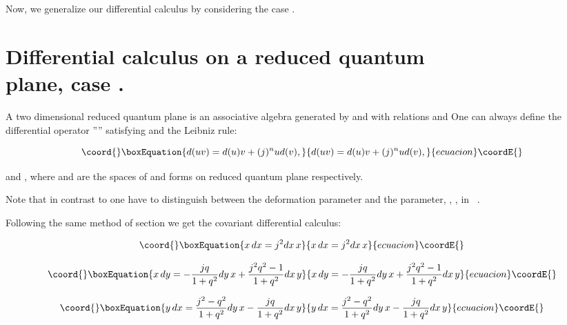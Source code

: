 \documentclass[a4paper,12pt,thmsa]{article}
\begin{document}
Now, we generalize our differential calculus by considering the case \coordHE{}.

\section{Differential calculus on a reduced quantum\protect\\plane, case \coordHE{}.}

A two dimensional reduced quantum plane is an associative algebra generated
by \coordHE{} and \coordHE{} with relations \coordHE{} and \coordHE{} One can always define the
differential operator ''\coordHE{}'' satisfying \coordHE{}  \coordHE{} and the
Leibniz rule:

\begin{equation}\coord{}\boxEquation{
d(uv)=d(u)v+(j)^nud(v),
}{
d(uv)=d(u)v+(j)^nud(v),
}{ecuacion}\coordE{}\end{equation}

\coordHE{} and \coordHE{}, where \coordHE{} and \coordHE{} are
the spaces of \coordHE{} and \coordHE{} forms on reduced quantum plane respectively.

Note that in contrast to \coordHE{} one have to distinguish between the
deformation parameter \coordHE{} and the \coordHE{} parameter, \coordHE{}, \coordHE{}, in ~\coordHE{}.

Following the same method of section \coordHE{} we get the covariant differential
calculus:

\begin{equation}\coord{}\boxEquation{
x\, dx=j^{2}dx\, x
}{
x\, dx=j^{2}dx\, x
}{ecuacion}\coordE{}\end{equation}

\begin{equation}\coord{}\boxEquation{
x\, dy=-\frac{jq}{1+q^2}dy\, x+\frac{j^2q^2-1}{1+q^2}dx\, y
}{
x\, dy=-\frac{jq}{1+q^2}dy\, x+\frac{j^2q^2-1}{1+q^2}dx\, y
}{ecuacion}\coordE{}\end{equation}

\begin{equation}\coord{}\boxEquation{
y\, dx=\frac{j^2-q^2}{1+q^2}dy\, x-\frac{jq}{1+q^2}dx\, y
}{
y\, dx=\frac{j^2-q^2}{1+q^2}dy\, x-\frac{jq}{1+q^2}dx\, y
}{ecuacion}\coordE{}\end{equation}
\end{document}

